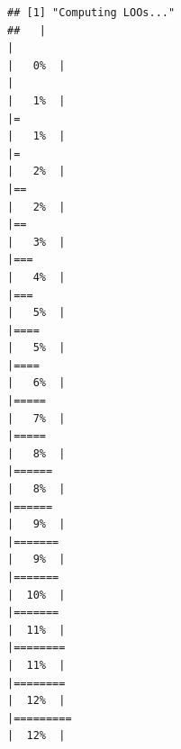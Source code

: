 \documentclass[
]{article}
\begin{document}
\begin{verbatim}
## [1] "Computing LOOs..."
##   |                                                                              |                                                                      |   0%  |                                                                              |                                                                      |   1%  |                                                                              |=                                                                     |   1%  |                                                                              |=                                                                     |   2%  |                                                                              |==                                                                    |   2%  |                                                                              |==                                                                    |   3%  |                                                                              |===                                                                   |   4%  |                                                                              |===                                                                   |   5%  |                                                                              |====                                                                  |   5%  |                                                                              |====                                                                  |   6%  |                                                                              |=====                                                                 |   7%  |                                                                              |=====                                                                 |   8%  |                                                                              |======                                                                |   8%  |                                                                              |======                                                                |   9%  |                                                                              |=======                                                               |   9%  |                                                                              |=======                                                               |  10%  |                                                                              |=======                                                               |  11%  |                                                                              |========                                                              |  11%  |                                                                              |========                                                              |  12%  |                                                                              |=========                                                             |  12%  |                                                              
\end{verbatim}
\end{document}
